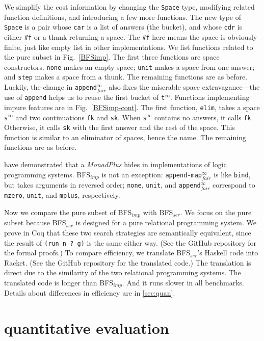 \documentclass[acmlarge]{acmart}
\newcommand{\appendInfFair}{\texttt{append$^\infty_{fair}$}}
\newcommand{\appendMapInfFair}{\texttt{append-map$^\infty_{fair}$}}
\newcommand{\sInf}{\texttt{s$^\infty$}}
\newcommand{\tInf}{\texttt{t$^\infty$}}
\newcommand{\BFSser}[0]{BFS$_{ser}$}
\newcommand{\BFSimp}[0]{BFS$_{imp}$}
\begin{document}
We simplify the cost information by changing the \texttt{Space} type, 
modifying related function definitions, and introducing a few more functions.
The new type of \texttt{Space} is a pair whose \texttt{car} is a list of 
answers (the bucket), and whose \texttt{cdr} is either \texttt{\#{}f} or a 
thunk returning a space. The \texttt{\#{}f} here means the space is obviously 
finite, just like empty list in other implementations.
We list functions related to the pure subset in Fig.~\ref{BFSimp}. The first 
three functions are space constructors. \texttt{none} makes an empty space; 
\texttt{unit} makes a space from one answer; and \texttt{step} makes a space 
from a thunk. The remaining functions are as before. 
Luckily, the change in \appendInfFair{} also fixes the miserable space 
extravagance---the use of \texttt{append} helps us to reuse the first 
bucket of \tInf{}. 
Functions implementing impure features are in Fig.~\ref{BFSimp-cont}. The 
first function, \texttt{elim}, takes a space \sInf{} and two 
continuations \texttt{fk} and \texttt{sk}. When \sInf{} contains 
no answers, it calls \texttt{fk}. Otherwise, it calls 
\texttt{sk} with the first answer and the rest of the space. This function is 
similar to an eliminator of spaces, hence the name. The remaining 
functions are as before.

\citet{kiselyov2005backtracking} have demonstrated that a \emph{MonadPlus} 
hides in implementations of logic programming systems. \BFSimp{} is not an 
exception: \appendMapInfFair{} is like \texttt{bind}, but takes 
arguments in reversed order; \texttt{none}, \texttt{unit}, and 
\appendInfFair{} correspond to \texttt{mzero}, \texttt{unit}, and 
\texttt{mplus}, respectively.

Now we compare the pure subset of \BFSimp{} with \BFSser{}. We 
focus on the pure subset because \BFSser{} is designed for a pure 
relational programming system. We prove in Coq that these two search strategies 
are semantically equivalent, since the result of \texttt{(run n ? g)} is 
the same either way. (See the GitHub repository for the formal proofs.) To 
compare efficiency, we translate \BFSser{}'s Haskell code into Racket. (See the 
GitHub repository for the translated code.)
The translation is direct due to the 
similarity of the two relational programming systems. The translated code is 
longer than \BFSimp{}. And it runs slower in all benchmarks. Details about 
differences in efficiency are in \autoref{sec:quan}.

\section{quantitative evaluation}
\label{sec:quan}
\end{document}
